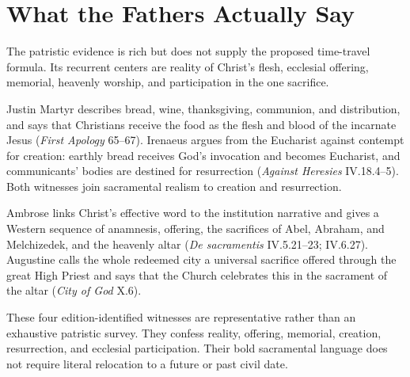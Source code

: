 \section{What the Fathers Actually Say}

The patristic evidence is rich but does not supply the proposed time-travel
formula. Its recurrent centers are reality of Christ's flesh, ecclesial
offering, memorial, heavenly worship, and participation in the one sacrifice.

Justin Martyr describes bread, wine, thanksgiving, communion, and distribution,
and says that Christians receive the food as the flesh and blood of the
incarnate Jesus (\emph{First Apology} 65--67). Irenaeus argues from the
Eucharist against contempt for creation: earthly bread receives God's
invocation and becomes Eucharist, and communicants' bodies are destined for
resurrection (\emph{Against Heresies} IV.18.4--5). Both witnesses join
sacramental realism to creation and resurrection.

Ambrose links Christ's effective word to the institution narrative and gives a
Western sequence of anamnesis, offering, the sacrifices of Abel, Abraham, and
Melchizedek, and the heavenly altar (\emph{De sacramentis} IV.5.21--23;
IV.6.27). Augustine calls the whole redeemed city a universal sacrifice
offered through the great High Priest and says that the Church celebrates this
in the sacrament of the altar (\emph{City of God} X.6).

These four edition-identified witnesses are representative rather than an
exhaustive patristic survey. They confess reality, offering, memorial, creation,
resurrection, and ecclesial participation. Their bold sacramental language
does not require literal relocation to a future or past civil date.

